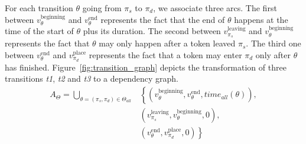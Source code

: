 For each transition $\theta$ going from $\pi_s$ to $\pi_d$, we associate
three arcs. The first between $v_\theta^\text{beginning}$ and $v_\theta^\text{end}$
represents the fact that the end of $\theta$ happens at the time of the
start of $\theta$ plus its duration. The second between $v_{\pi_{s}}^\text{leaving}$
and $v_\theta^\text{beginning}$ represents the fact that $\theta$ may only
happen after a token leaved $\pi_s$. The third one between $v_\theta^\text{end}$ and
$v_{\pi_{d}}^\text{place}$ represents the fact that a token may enter $\pi_d$ only
after $\theta$ has finished.
Figure~\ref{fig:transition_graph} depicts the transformation of three
transitions \emph{t1}, \emph{t2} and \emph{t3} to a dependency graph.
\begin{align*}
A_{\Theta}=\bigcup_{\theta=\left(\pi_{s},\pi_{d}\right)\in\Theta_{all}} & \left\{ \left(v_\theta^\text{beginning},v_\theta^\text{end},time_{all}\left(\theta\right)\right),\right.\\
 & \left(v_{\pi_{s}}^\text{leaving},v_\theta^\text{beginning},0\right),\\
 & \left. \left(v_\theta^\text{end},v_{\pi_{d}}^\text{place},0\right)\right\}
\end{align*}

